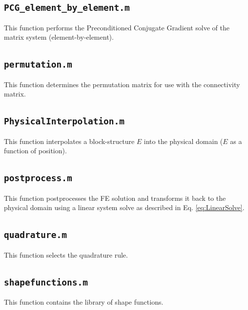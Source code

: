 \documentclass[10pt]{article}
\begin{document}
\subsection{\texttt{PCG\_element\_by\_element.m}}
This function performs the Preconditioned Conjugate Gradient solve of the matrix system (element-by-element).


\subsection{\texttt{permutation.m}}
This function determines the permutation matrix for use with the connectivity matrix.


\subsection{\texttt{PhysicalInterpolation.m}}
This function interpolates a block-structure \(E\) into the physical domain (\(E\) as a function of position).


\subsection{\texttt{postprocess.m}}
This function postprocesses the FE solution and transforms it back to the physical domain using a linear system solve as described in Eq. \eqref{eq:LinearSolve}.


\subsection{\texttt{quadrature.m}}
This function selects the quadrature rule.


\subsection{\texttt{shapefunctions.m}}
This function contains the library of shape functions.

\end{document}
